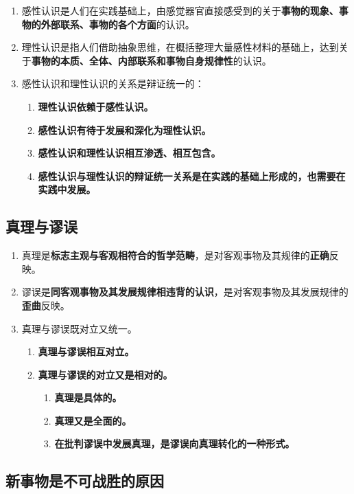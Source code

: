 \documentclass[12pt, a4paper, oneside]{ctexbook}
\begin{document}
\begin{enumerate}
\item 感性认识是人们在实践基础上，由感觉器官直接感受到的关于\textbf{事物的现象、事物的外部联系、事物的各个方面}的认识。
\item 理性认识是指人们借助抽象思维，在概括整理大量感性材料的基础上，达到关于\textbf{事物的本质、全体、内部联系和事物自身规律性}的认识。
\item 感性认识和理性认识的关系是辩证统一的：
\begin{enumerate}
\item \textbf{理性认识依赖于感性认识。}
\item \textbf{感性认识有待于发展和深化为理性认识。}
\item \textbf{感性认识和理性认识相互渗透、相互包含。}
\item \textbf{感性认识与理性认识的辩证统一关系是在实践的基础上形成的，也需要在实践中发展。}
\end{enumerate}
\end{enumerate}

\subsection{真理与谬误}

\begin{enumerate}
\item 真理是\textbf{标志主观与客观相符合的哲学范畴}，是对客观事物及其规律的\textbf{正确}反映。
\item 谬误是\textbf{同客观事物及其发展规律相违背的认识}，是对客观事物及其发展规律的\textbf{歪曲}反映。
\item 真理与谬误既对立又统一。
\begin{enumerate}
\item \textbf{真理与谬误相互对立。}
\item \textbf{真理与谬误的对立又是相对的。}
\begin{enumerate}
\item \textbf{真理是具体的。}
\item \textbf{真理又是全面的。}
\item \textbf{在批判谬误中发展真理，是谬误向真理转化的一种形式。}
\end{enumerate}
\end{enumerate}
\end{enumerate}

\subsection{新事物是不可战胜的原因}
\end{document}
